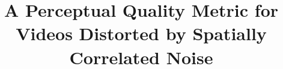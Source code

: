 \documentclass{sig-alternate}
\begin{document}
%

\title{A Perceptual Quality Metric for Videos Distorted by Spatially Correlated Noise}
%
%
%
%
%
\end{document}

